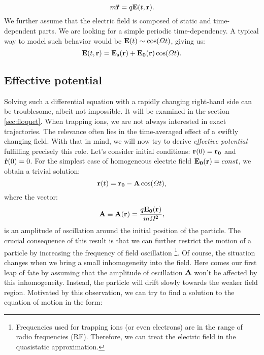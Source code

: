 \begin{equation}
	\label{equation of motion}
	m \vb{\ddot{r}} = q \vb{E}(t,\vb{r}).
\end{equation}
We further assume that the electric field is composed of static and time-dependent parts. We are looking for a simple periodic time-dependency. A typical way to model such behavior would be $\vb{E}(t) \sim \cos(\Omega t)$, giving us:
\begin{equation}
	\vb{E}(t,\vb{r}) = \vb{E_s}(\vb{r}) + \vb{E_0}(\vb{r}) \cos(\Omega t).
\end{equation}
	\subsection{Effective potential}
Solving such a differential equation with a rapidly changing right-hand side can be troublesome, albeit not impossible. It will be examined in the section \ref{sec:floquet}. When trapping ions, we are not always interested in exact trajectories. The relevance often lies in the time-averaged effect of a swiftly changing field. With that in mind, we will now try to derive \emph{effective potential} fulfilling precisely this role.
Let's consider initial conditions: $\vb{r}(0) = \vb{r_0}$ and $\vb{\dot{r}}(0) = 0$. For the simplest case of homogeneous electric field $\vb{E_0}(\vb{r}) = const$, we obtain a trivial solution:
\begin{equation}
	\label{solution for homogenious field}
	\vb{r}(t) = \vb{r_0} - \vb{A} \cos(\Omega t),
\end{equation}
where the vector: 
\begin{equation}
	\label{oscillation amplitude}
	\vb{A} \equiv \vb{A}(\vb{r}) = \frac{q \vb{E_0}(\vb{r})}{m \Omega^2},
\end{equation}
is an amplitude of oscillation around the initial position of the particle. The crucial consequence of this result is that we can further restrict the motion of a particle by increasing the frequency of field oscillation \footnote{Frequencies used for trapping ions (or even electrons) are in the range of radio frequencies (RF). Therefore, we can treat the electric field in the quasistatic approximation.}. Of course, the situation changes when we bring a small inhomogeneity into the field. Here comes our first leap of fate by assuming that the amplitude of oscillation $\vb{A}$ won't be affected by this inhomogeneity. Instead, the particle will drift slowly towards the weaker field region. Motivated by this observation, we can try to find a solution to the equation of motion in the form:
